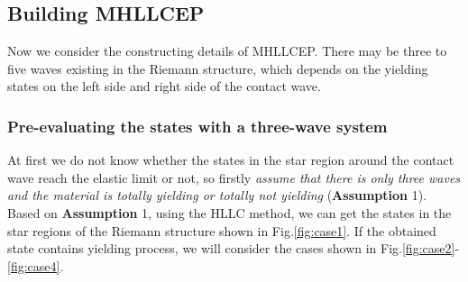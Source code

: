 \documentclass[review]{elsarticle}
\begin{document}
\subsection{Building MHLLCEP}

Now we consider the constructing details of MHLLCEP. There may be three to five waves existing  in the Riemann structure, which depends on the yielding states  on the left side and right side of the contact wave.

\subsubsection{Pre-evaluating the states with a three-wave system}\label{sec:case1}
At first we do not know whether the states in the star region around the contact wave reach the elastic limit or not, so firstly \emph{assume that there is only three waves and the material is totally yielding or totally not yielding} (\textbf{Assumption} 1). Based on \textbf{Assumption} 1, using the HLLC method, we can get the states in the star regions of the Riemann structure shown in  Fig.\ref{fig:case1}. If the obtained state contains yielding process, we will consider the cases shown in Fig.\ref{fig:case2}-\ref{fig:case4}.
\end{document}
